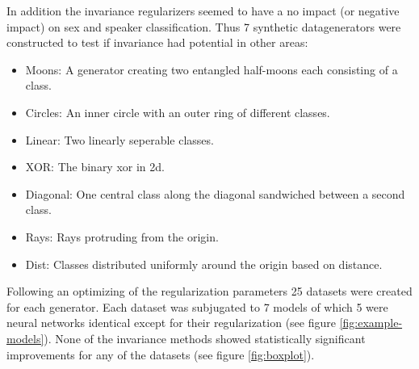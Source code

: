 In addition the invariance regularizers seemed to have a no impact (or negative impact) on sex and speaker classification. Thus 7 synthetic datagenerators were constructed to test if invariance had potential in other areas:
\begin{itemize}
\item{Moons: A generator creating two entangled half-moons each consisting of a class.}
\item{Circles: An inner circle with an outer ring of different classes.}
\item{Linear: Two linearly seperable classes.}
\item{XOR: The binary xor in 2d.}
\item{Diagonal: One central class along the diagonal sandwiched between a second class.}
\item{Rays: Rays protruding from the origin.}
\item{Dist: Classes distributed uniformly around the origin based on distance.}
\end{itemize}

Following an optimizing of the regularization parameters 25 datasets were created for each generator. Each dataset was subjugated to 7 models of which 5 were neural networks identical except for their regularization (see figure \ref{fig:example-models}). None of the invariance methods showed statistically significant improvements for any of the datasets (see figure \ref{fig:boxplot}).
